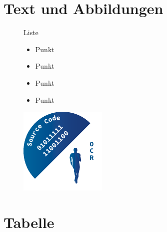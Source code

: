 \documentclass[a4paper,fontsize=14pt,DIV=calc,fleqn,parskip=half]{scrartcl}
\begin{document}
	\section*{Text und Abbildungen}%
	\begin{figure}[!h]%
		\centering
		\begin{minipage}[c]{0.55\textwidth}
			Liste
			\begin{itemize} 
				\item Punkt
				\item Punkt
				\item Punkt
				\item Punkt
			\end{itemize}
		\end{minipage}
		\hfill
		\begin{minipage}[c]{0.35\textwidth}
			\includegraphics[width=\textwidth]{images/Logo/Logo2}%
		\end{minipage}
	\end{figure}

	\newpage
	\section*{Tabelle}%
\end{document}
